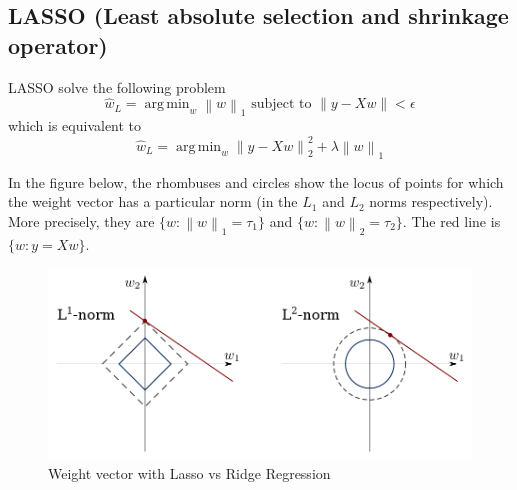\documentclass[12pt]{article}
\theoremstyle{definition}
\DeclareMathOperator*{\argmin}{arg\,min}
\newcommand{\e}{\epsilon}
\newcommand{\norm}[1]{\left\lVert#1\right\rVert}
\begin{document}
\subsection{LASSO (Least absolute selection and shrinkage operator)}
LASSO solve the following problem
\begin{equation}
	\hat w_L = \argmin_w \norm{w}_1 \text{ subject to } \norm{y - Xw} < \e
\end{equation}
which is equivalent to 
\begin{equation}
	\hat w_L = \argmin_w \norm{y - Xw}^2_2 + \lambda \norm{w}_1
\end{equation}

In the figure below, the rhombuses and circles show the locus of points for which the weight vector has a particular norm (in the $L_1$ and $L_2$ norms respectively). More precisely, they are $\{w : \norm{w}_1 = \tau_1\}$ and $\{w : \norm{w}_2 = \tau_2\}$. The red line is $\{w : y=Xw\}$.
\begin{figure}[H]
	\begin{center}
		\includegraphics[scale=.35]{lasso_ridge.png}
	\end{center}
	\caption{Weight vector with Lasso vs Ridge Regression}
\end{figure}
\end{document}
